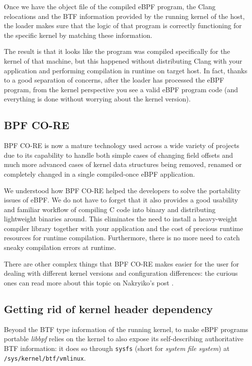 Once we have the object file of the compiled eBPF program, the Clang relocations and the BTF information provided by the running kernel of the host, the loader makes sure that the logic of that program is correctly functioning for the specific kernel by matching these information.

The result is that it looks like the program was compiled specifically for the kernel of that machine, but this happened without distributing Clang with your application and performing compilation in runtime on target host.
In fact, thanks to a good separation of concerns, after the loader has processed the eBPF program, from the kernel perspective you see a valid eBPF program code (and everything is done without worrying about the kernel version).

\subsection{BPF CO-RE}

BPF CO-RE is now a mature technology used across a wide variety of projects due to its capability to handle both simple cases of changing field offsets and much more advanced cases of kernel data structures being removed, renamed or completely changed in a single compiled-once eBPF application.

We understood how BPF CO-RE helped the developers to solve the portability issues of eBPF.
We do not have to forget that it also provides a good usability and familiar workflow of compiling C code into binary and distributing lightweight binaries around. 
This eliminates the need to install a heavy-weight compiler library together with your application and the cost of precious runtime resources for runtime compilation. 
Furthermore, there is no more need to catch sneaky compilation errors at runtime.

There are other complex things that BPF CO-RE makes easier for the user for dealing with different kernel versions and configuration differences: the curious ones can read more about this topic on Nakryiko's post \cite{ANCOREPost}.

\subsection{Getting rid of kernel header dependency}

Beyond the BTF type information of the running kernel, to make eBPF programs portable \textit{libbpf} relies on the kernel to also expose its self-describing authoritative BTF information: it does so through \verb|sysfs| (short for \textit{system file system}) at \verb|/sys/kernel/btf/vmlinux|.

